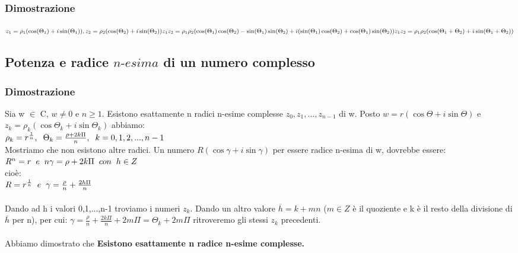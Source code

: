 \documentclass[11pt, a4paper]{article}
\begin{document}
\subsubsection*{Dimostrazione}
\begin{math}
z_1=\rho_1(\cos(\Theta_1)+i\sin(\Theta_1)),z_2=\rho_2(\cos(\Theta_2)+i\sin(\Theta_2))\\
z_1z_2=\rho_1\rho_2(\cos(\Theta_1)\cos(\Theta_2)-\sin(\Theta_1)\sin(\Theta_2)+i(\sin(\Theta_1)\cos(\Theta_2)+\cos(\Theta_1)\sin(\Theta_2))\\
z_1z_2=\rho_1\rho_2(\cos(\Theta_1+\Theta_2)+i\sin(\Theta_1+\Theta_2))
\end{math}

\subsection{Potenza e radice $\textit{n-esima}$ di un numero complesso}
\subsubsection*{Dimostrazione}
Sia w $\in$ C, $w\neq0$ e $n\geq 1$. Esistono esattamente n radici n-esime complesse $z_0,z_1, ... , z_{n-1}$ di w. Posto $ w=r(\cos\Theta + i\sin\Theta)$ e $z_k = \rho_k(\cos\Theta_k + i\sin\Theta_k)$ abbiamo:\\
$\rho_k=r^{\frac{1}{n}}, \hspace{0.2cm} \Theta_k=\frac{\rho+2k\Pi}{n}, \hspace{0.2cm} k=0,1,2,...,n-1	$\\
Mostriamo che non esistono altre radici. Un numero $R(\cos\gamma + i\sin\gamma)$ per essere radice n-esima di w, dovrebbe essere:\\
$R^n=r \hspace{0.2cm} e \hspace{0.2cm} n\gamma=\rho+2k\Pi \hspace{0.2cm} con \hspace{0.2cm} h\in Z$\\ cioè:\\ 
$R=r^{\frac{1}{n}} \hspace{0.2cm} e \hspace{0.2cm} \gamma=\frac{\rho}{n}+\frac{2h\Pi}{n}$
\\
\\
Dando ad h i valori 0,1,...,n-1 troviamo i numeri $z_k$. Dando un altro valore $\overline{h}=k+mn$ ($m\in Z$ è il quoziente e k è il resto della divisione di $\overline{h}$ per n), per cui: $\gamma=\frac{\rho}{n}+\frac{2k\Pi}{n}+2m\Pi=\Theta_k+2m\Pi$ ritroveremo gli stessi $z_k$ precedenti.\\\\
Abbiamo dimostrato che \textbf{Esistono esattamente n radice n-esime complesse.}
\end{document}
